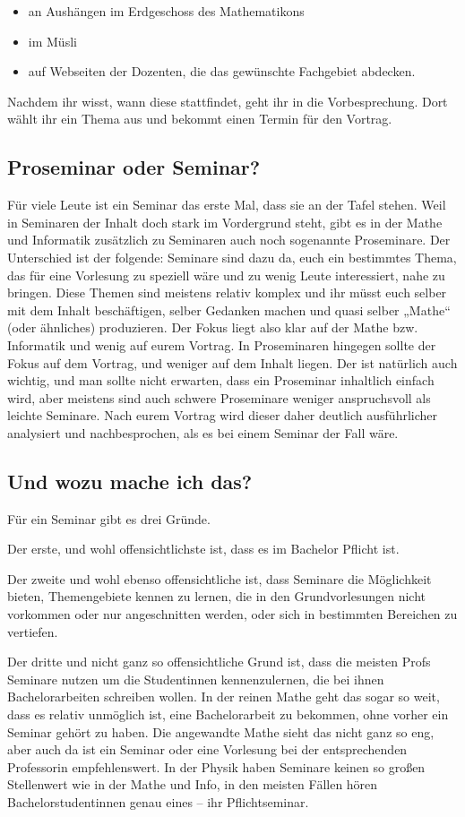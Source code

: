 \begin{itemize}
	\item an Aushängen im Erdgeschoss des Mathematikons
	\item im Müsli
	\item auf Webseiten der Dozenten, die das gewünschte Fachgebiet abdecken.
\end{itemize}

Nachdem ihr wisst, wann diese stattfindet, geht ihr in die Vorbesprechung. Dort wählt ihr ein Thema aus und bekommt einen Termin für den Vortrag.

\subsection{Proseminar oder Seminar?}
Für viele Leute ist ein Seminar das erste Mal, dass sie an der Tafel stehen.  Weil in Seminaren der Inhalt doch stark im Vordergrund steht, gibt es in der Mathe und Informatik zusätzlich zu Seminaren auch noch sogenannte Proseminare. Der Unterschied ist der folgende: Seminare sind dazu da, euch ein bestimmtes Thema, das für eine Vorlesung zu speziell wäre und zu wenig Leute interessiert, nahe zu bringen. Diese Themen sind meistens relativ komplex und ihr müsst euch selber mit dem Inhalt beschäftigen, selber Gedanken machen und quasi selber „Mathe“ (oder ähnliches) produzieren. Der Fokus liegt also klar auf der Mathe bzw. Informatik und wenig auf eurem Vortrag. In Proseminaren hingegen sollte der Fokus auf dem Vortrag, und weniger auf dem Inhalt liegen. Der ist natürlich auch wichtig, und man sollte nicht erwarten, dass ein Proseminar inhaltlich einfach wird, aber meistens sind auch schwere Proseminare weniger anspruchsvoll als leichte Seminare. Nach eurem Vortrag wird dieser daher deutlich ausführlicher analysiert und nachbesprochen, als es bei einem Seminar der Fall wäre.

\subsection{Und wozu mache ich das?}
Für ein Seminar gibt es drei Gründe.

Der erste, und wohl offensichtlichste ist, dass es im Bachelor Pflicht ist.

Der zweite und wohl ebenso offensichtliche ist, dass Seminare die Möglichkeit bieten, Themengebiete kennen zu lernen, die in den Grundvorlesungen nicht vorkommen oder nur angeschnitten werden, oder sich in bestimmten Bereichen zu vertiefen.

Der dritte und nicht ganz so offensichtliche Grund ist, dass die meisten Profs Seminare nutzen um die Studentinnen kennenzulernen, die bei ihnen Bachelorarbeiten schreiben wollen. In der reinen Mathe geht das sogar so weit, dass es relativ unmöglich ist, eine Bachelorarbeit zu bekommen, ohne vorher ein Seminar gehört zu haben. Die angewandte Mathe sieht das nicht ganz so eng, aber auch da ist ein Seminar oder eine Vorlesung bei der entsprechenden Professorin empfehlenswert. In der Physik haben Seminare keinen so großen Stellenwert wie in der Mathe und Info, in den meisten Fällen hören Bachelorstudentinnen genau eines -- ihr Pflichtseminar. 
